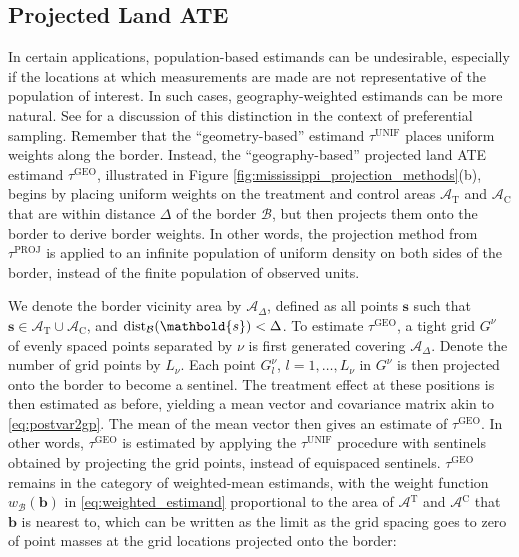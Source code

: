 \documentclass[letter]{article}
\DeclarePairedDelimiter{\parenthesis}{\lparen}{\rparen}
\newcommand{\del}[1]{\parenthesis*{#1}}
\newcommand{\area}{\mathcal{A}}
\newcommand{\treat}{\mathrm{T}}
\newcommand{\ctrol}{\mathrm{C}}
\newcommand{\treatarea}{\area{}^{\treat}}
\newcommand{\ctrolarea}{\area{}^{\ctrol}}
\newcommand{\svec}{\mathbold{s}}
\newcommand{\border}{\mathcal{B}}
\newcommand{\sentinel}{\bm{b}}
\newcommand{\unifavg}{\tau^{\mathrm{UNIF}}}
\newcommand{\tauproj}{\tau^{\mathrm{PROJ}}}
\newcommand{\taugeo}{\tau^{\mathrm{GEO}}}
\DeclareMathOperator{\dist}{dist}
\newcommand{\buffer}{\Delta}
\newcommand{\weightb}{w_{\border}}
\newcommand{\gridres}{\nu}
\newcommand{\grid}{G^\gridres}
\renewcommand{\cite}[1]{\citet{#1}}
\begin{document}
    	\subsection{Projected Land ATE}\label{projected-land-ate}

In certain applications, population-based estimands can be undesirable, especially if the locations at which measurements are made are not representative of the population of interest.
In such cases, geography-weighted estimands can be more natural.
See \cite{antonelli2016positive} for a discussion of this distinction in the context of preferential sampling.
Remember that the ``geometry-based'' estimand \(\unifavg\) places uniform weights along the border.
Instead, the ``geography-based'' projected land ATE estimand \(\taugeo\), illustrated in Figure \ref{fig:mississippi_projection_methods}(b), begins by placing uniform weights on the treatment and control areas \(\area_\treat\) and \(\area_\ctrol\) that are within distance \(\buffer\) of the border \(\border\), but then projects them onto the border to derive border weights.
In other words, the projection method from \(\tauproj\) is applied to an infinite population of uniform density on both sides of the border, instead of the finite population of observed units.

We denote the border vicinity area by \(\area_\buffer\), defined as all points \(\svec\) such that \(\svec \in {\area_\treat \cup \area_\ctrol}\), and \(\dist_{\border}\del{\svec} < \buffer\).
To estimate \(\taugeo\), a tight grid \(\grid\) of evenly spaced points separated by \(\gridres\) is first generated covering \(\area_\buffer\).
Denote the number of grid points by \(L_\gridres\).
Each point \(\grid_l\), \(l=1,\dotsc,L_\gridres\) in \(\grid\) is then projected onto the border to become a sentinel.
The treatment effect at these positions is then estimated as before, yielding a mean vector and covariance matrix akin to \eqref{eq:postvar2gp}.
The mean of the mean vector then gives an estimate of \(\taugeo\).
In other words, \(\taugeo\) is estimated by applying the \(\unifavg\) procedure with sentinels obtained by projecting the grid points, instead of equispaced sentinels.
\(\taugeo\) remains in the category of weighted-mean estimands, with the weight function \(\weightb(\sentinel)\) in \eqref{eq:weighted_estimand} proportional to the area of \(\treatarea\) and \(\ctrolarea\) that \(\sentinel\) is nearest to, which can be written as the limit as the grid spacing goes to zero of point masses at the grid locations projected onto the border:
\end{document}
